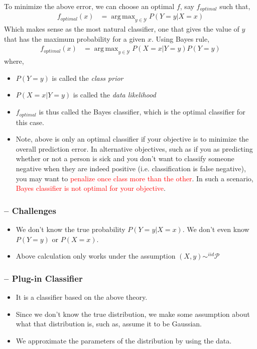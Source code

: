 \documentclass{article}
\DeclareMathOperator*{\argmax}{arg\,max}
\newcommand{\red}[1]{\textcolor{red}{#1}}
\newcommand{\mcaly}{\mathcal{Y}}
\begin{document}
To minimize the above error, we can choose an optimal $f$, say $f_{optimal}$ such that,
\begin{align*}
    f_{optimal}(x) &= \argmax_{y \in \mcaly} P(Y = y \vert X = x)
\end{align*}
Which makes sense as the most natural classifier, one that gives the value of $y$ that has the maximum probability for a given $x$. Using Bayes rule,
\begin{align*}
    f_{optimal}(x) &= \argmax_{y \in \mcaly} P(X = x | Y = y) P(Y = y)
\end{align*}
where,
\begin{itemize}
    \item $P(Y=y)$ is called the \textit{class prior}
    \item $P(X=x|Y=y)$ is called the \textit{data likelihood}
    \item $f_{optimal}$ is thus called the Bayes classifier, which is the optimal classifier for this case.
    \item Note, above is only an optimal classifier if your objective is to minimize the overall prediction error. In alternative objectives, such as if you as predicting whether or not a person is sick and you don't want to classify someone negative when they are indeed positive (i.e. classification is false negative), you may want to \red{penalize once class more than the other}. In such a scenario, \red{Bayes classifier is not optimal for your objective}.
\end{itemize}


\subsubsection{-- Challenges}
\begin{itemize}
    \item We don't know the true probability $P(Y=y|X=x)$. We don't even know $P(Y=y)$ or $P(X=x)$.
    \item Above calculation only works under the assumption $(X,y) \sim^{iid} \mathcal{P}$
\end{itemize}

\subsubsection{-- Plug-in Classifier}
\begin{itemize}
    \item It is a classifier based on the above theory.
    \item Since we don't know the true distribution, we make some assumption about what that distribution is, such as, assume it to be Gaussian.
    \item We approximate the parameters of the distribution by using the data.
\end{itemize}
\end{document}
